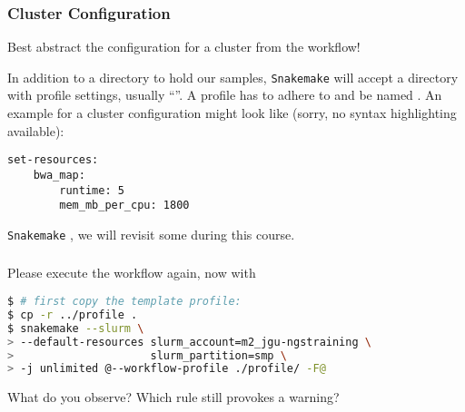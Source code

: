 \begin{frame}[fragile]
  \frametitle{Cluster Configuration}
  \begin{hint}
  	Best abstract the configuration for a cluster from the workflow!
  \end{hint}
  In addition to a  directory to hold our samples, \texttt{Snakemake} will accept a directory with profile settings, usually ``''.
  \pause
  A profile has to adhere to  and be named . An example for a cluster configuration might look like (sorry, no syntax highlighting available):
  \begin{lstlisting}[style=Plain]
set-resources:
    bwa_map:
        runtime: 5
        mem_mb_per_cpu: 1800
  \end{lstlisting}
  \pause
  
  \texttt{Snakemake} , we will revisit some during this course.

\end{frame}

\begin{frame}[fragile]
  \frametitle{}
  Please execute the workflow again, now with 
  \begin{lstlisting}[language=Bash, style=Shell, basicstyle=\footnotesize]
$ # first copy the template profile:
$ cp -r ../profile .
$ snakemake --slurm \
> --default-resources slurm_account=m2_jgu-ngstraining \
>                     slurm_partition=smp \
> -j unlimited @--workflow-profile ./profile/ -F@
  \end{lstlisting}
  \begin{question}
  	What do you observe? Which rule still provokes a warning?
  \end{question}
\end{frame}

